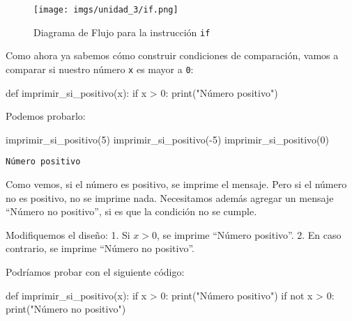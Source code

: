 \documentclass[
  letterpaper,
  DIV=11,
  numbers=noendperiod]{scrreprt}
\newenvironment{Shaded}{\begin{snugshade}}{\end{snugshade}}
\newcommand{\BuiltInTok}[1]{\textcolor[rgb]{0.00,0.23,0.31}{#1}}
\newcommand{\ControlFlowTok}[1]{\textcolor[rgb]{0.00,0.23,0.31}{#1}}
\newcommand{\DecValTok}[1]{\textcolor[rgb]{0.68,0.00,0.00}{#1}}
\newcommand{\KeywordTok}[1]{\textcolor[rgb]{0.00,0.23,0.31}{#1}}
\newcommand{\NormalTok}[1]{\textcolor[rgb]{0.00,0.23,0.31}{#1}}
\newcommand{\OperatorTok}[1]{\textcolor[rgb]{0.37,0.37,0.37}{#1}}
\newcommand{\StringTok}[1]{\textcolor[rgb]{0.13,0.47,0.30}{#1}}
\begin{document}
\begin{figure}[H]

{\centering \texttt{[image: imgs/unidad\_3/if.png]}

}

\caption{Diagrama de Flujo para la instrucción \texttt{if}}

\end{figure}%

Como ahora ya sabemos cómo construir condiciones de comparación, vamos a
comparar si nuestro número \texttt{x} es mayor a \texttt{0}:

\begin{Shaded}
\begin{Highlighting}[]
\KeywordTok{def}\NormalTok{ imprimir\_si\_positivo(x):}
  \ControlFlowTok{if}\NormalTok{ x }\OperatorTok{\textgreater{}} \DecValTok{0}\NormalTok{:}
      \BuiltInTok{print}\NormalTok{(}\StringTok{"Número positivo"}\NormalTok{)}
\end{Highlighting}
\end{Shaded}

Podemos probarlo:

\begin{Shaded}
\begin{Highlighting}[]
\NormalTok{imprimir\_si\_positivo(}\DecValTok{5}\NormalTok{)}
\NormalTok{imprimir\_si\_positivo(}\OperatorTok{{-}}\DecValTok{5}\NormalTok{)}
\NormalTok{imprimir\_si\_positivo(}\DecValTok{0}\NormalTok{)}
\end{Highlighting}
\end{Shaded}

\begin{verbatim}
Número positivo
\end{verbatim}

Como vemos, si el número es positivo, se imprime el mensaje. Pero si el
número no es positivo, no se imprime nada. Necesitamos además agregar un
mensaje ``Número no positivo'', si es que la condición no se cumple.

Modifiquemos el diseño: 1. Si \(x>0\), se imprime ``Número positivo''.
2. En caso contrario, se imprime ``Número no positivo''.

Podríamos probar con el siguiente código:

\begin{Shaded}
\begin{Highlighting}[]
\KeywordTok{def}\NormalTok{ imprimir\_si\_positivo(x):}
  \ControlFlowTok{if}\NormalTok{ x }\OperatorTok{\textgreater{}} \DecValTok{0}\NormalTok{:}
      \BuiltInTok{print}\NormalTok{(}\StringTok{"Número positivo"}\NormalTok{)}
  \ControlFlowTok{if} \KeywordTok{not}\NormalTok{ x }\OperatorTok{\textgreater{}} \DecValTok{0}\NormalTok{:}
      \BuiltInTok{print}\NormalTok{(}\StringTok{"Número no positivo"}\NormalTok{)}
\end{Highlighting}
\end{Shaded}
\end{document}

